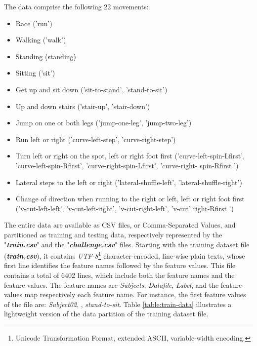 The data comprise the following 22 movements:
\begin{itemize}
    \item Race ('run')
    \item Walking ('walk')
    \item Standing (standing)
    \item Sitting ('sit')
    \item Get up and sit down ('sit-to-stand', 'stand-to-sit')
    \item Up and down stairs ('stair-up', 'stair-down')
    \item Jump on one or both legs ('jump-one-leg', 'jump-two-leg')
    \item Run left or right ('curve-left-step', 'curve-right-step')
    \item Turn left or right on the spot, left or right foot first ('curve-left-spin-Lfirst',
    'curve-left-spin-Rfirst', 'curve-right-spin-Lfirst', 'curve-right- spin-Rfirst ')
    \item Lateral steps to the left or right ('lateral-shuffle-left', 'lateral-shuffle-right')
    \item Change of direction when running to the right or left, left or right foot first
    ('v-cut-left-left', 'v-cut-left-right', 'v-cut-right-left', 'v-cut' right-Rfirst ')
\end{itemize}

The entire data are available as CSV files, or Comma-Separated Values, and partitioned as training and
testing data, respectively represented by the "\textbf{\emph{train.csv}}" and the "\textbf{\emph{challenge.csv}}"
files. Starting with the training dataset file (\textbf{\emph{train.csv}}), it contains
\emph{UTF-8}\footnote{Unicode Transformation Format, extended ASCII, variable-width encoding.}
character-encoded, line-wise plain texts, whose first line identifies the feature names
followed by the feature values. This file contains a total of 6402 lines, which include both the
feature names and the feature values. The feature names are \textit{Subjects}, \textit{Datafile}, \textit{Label},
and the feature values map respectively each feature name. For instance, the first feature values of
the file are: \textit{Subject02}, \textit{ },
\textit{stand-to-sit}. Table \ref{table:train-data} illustrates a lightweight version of the
data partition of the training dataset file.

